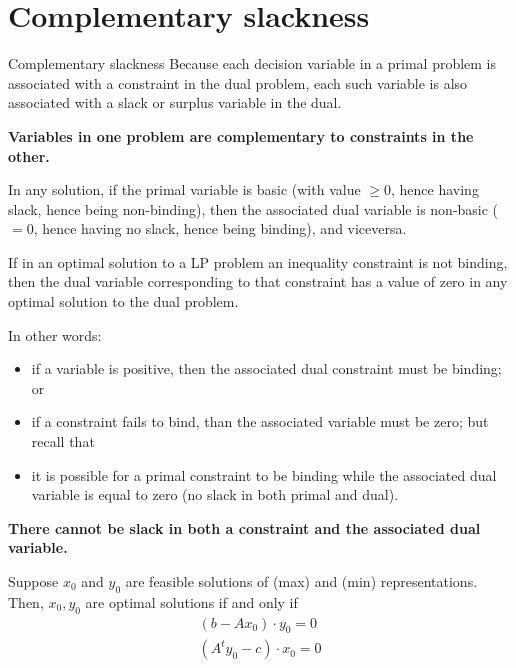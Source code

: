 \documentclass[c]{beamer}
\begin{document}
\section{Complementary slackness}

\begin{frame}[allowframebreaks]{Complementary slackness}
  Because each decision variable in a primal problem is associated with a constraint in the dual problem, each such variable is also associated with a slack or surplus variable in the dual.

  {\bf Variables in one problem are complementary to constraints in the other.}

  In any solution, if the primal variable is basic (with value $\geq0$, hence having slack, hence being non-binding), then the associated dual variable is non-basic ($=0$, hence having no slack, hence being binding), and viceversa.


  \begin{theorem}
    If in an optimal solution to a LP problem an inequality constraint is not binding, then the dual variable corresponding to that constraint has a value of zero in any optimal solution to the dual problem. 
  \end{theorem}
  
  \framebreak

  In other words: 
  \begin{itemize}
    \item if a variable is positive, then the associated dual constraint must be binding; or
    \item if a constraint fails to bind, than the associated variable must be zero; but recall that
    \item it is possible for a primal constraint to be binding while the associated dual variable is equal to zero (no slack in both primal and dual).
  \end{itemize}
  {\bf There cannot be slack in both a constraint and the associated dual variable.}
 
  \framebreak

  Suppose $x_0$ and $y_0$ are feasible solutions of (max) and (min) representations. Then, $x_0,y_0$ are optimal solutions if and only if
    \begin{eqnarray*}
      (b-Ax_0)\cdot y_0 =0\\
      (A^ty_0-c) \cdot x_0 =0
    \end{eqnarray*}
  
\end{frame}
\end{document}
